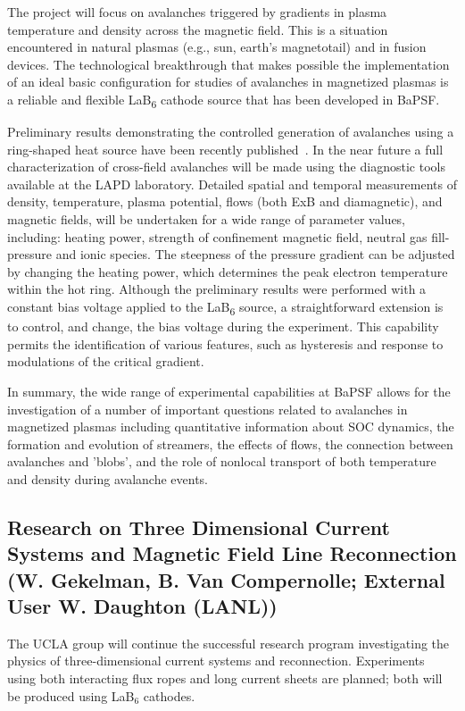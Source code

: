 \documentclass[11pt]{article}
\renewcommand{\cite}{\citep}
\begin{document}
The project will focus on avalanches triggered by gradients in plasma
temperature and density across the magnetic field. This is a situation
encountered in natural plasmas (e.g., sun, earth's magnetotail) and in
fusion devices. The technological breakthrough that makes possible the
implementation of an ideal basic configuration for studies of avalanches
in magnetized plasmas is a reliable and flexible LaB\textsubscript{6}
cathode source that has been developed in BaPSF.

Preliminary results demonstrating the controlled generation of
avalanches using a ring-shaped heat source have been recently
published~\cite{vancompernolle:2015b}. In the near future a full
characterization of cross-field avalanches will be made using the
diagnostic tools available at the LAPD laboratory. Detailed spatial
and temporal measurements of density, temperature, plasma potential,
flows (both ExB and diamagnetic), and magnetic fields, will be
undertaken for a wide range of parameter values, including: heating
power, strength of confinement magnetic field, neutral gas
fill-pressure and ionic species. The steepness of the pressure
gradient can be adjusted by changing the heating power, which
determines the peak electron temperature within the hot ring. Although
the preliminary results were performed with a constant bias voltage
applied to the LaB\textsubscript{6} source, a straightforward
extension is to control, and change, the bias voltage during the
experiment. This capability permits the identification of various
features, such as hysteresis and response to modulations of the
critical gradient.

In summary, the wide range of experimental capabilities at BaPSF allows
for the investigation of a number of important questions related to
avalanches in magnetized plasmas including quantitative information about SOC dynamics, the formation and evolution
of streamers, the effects of flows, the connection between avalanches
and 'blobs', and the role of nonlocal transport of both temperature and
density during avalanche events.

\subsection{Research on Three Dimensional Current Systems and Magnetic Field
Line Reconnection (W. Gekelman, B. Van Compernolle; External User
W. Daughton (LANL))}


The UCLA group will continue the successful
research program investigating the physics of three-dimensional
current systems and reconnection.  Experiments using both interacting
flux ropes and long current sheets are planned; both will be produced
using LaB$_6$ cathodes.  
\end{document}
